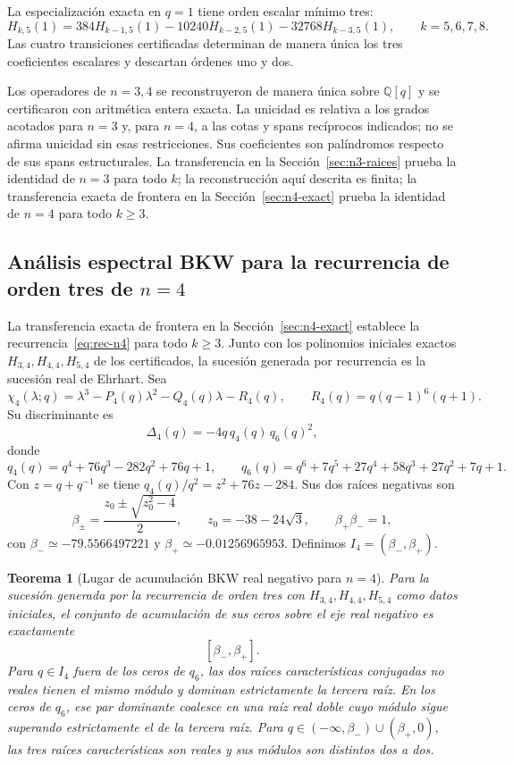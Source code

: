 \documentclass[11pt,a4paper]{article}
\newtheorem{theorem}{Teorema}[section]
\theoremstyle{definition}
\begin{document}
La especialización exacta en $q=1$ tiene orden escalar mínimo tres:
\begin{equation}\label{eq:escalar-n5}
H_{k,5}(1)=384H_{k-1,5}(1)
-10240H_{k-2,5}(1)-32768H_{k-3,5}(1),
\qquad k=5,6,7,8.
\end{equation}
Las cuatro transiciones certificadas determinan de manera única los tres
coeficientes escalares y descartan órdenes uno y dos.

Los operadores de $n=3,4$ se reconstruyeron de manera única sobre
$\mathbb Q[q]$ y se certificaron con aritmética entera exacta. La
unicidad es relativa a los grados acotados para $n=3$ y, para $n=4$, a
las cotas y spans recíprocos indicados; no se afirma unicidad sin esas
restricciones. Sus coeficientes son palíndromos respecto de sus spans
estructurales. La transferencia en la Sección~\ref{sec:n3-raices}
prueba la identidad de $n=3$ para todo $k$; la reconstrucción aquí
descrita es finita; la transferencia exacta de frontera en la
Sección~\ref{sec:n4-exact} prueba la identidad de $n=4$ para todo
$k\ge3$.

\subsection[Análisis espectral BKW para n=4]{Análisis espectral BKW para la recurrencia de orden tres de $n=4$}
\label{sec:n4-bkw}

La transferencia exacta de frontera en la Sección~\ref{sec:n4-exact}
establece la recurrencia~\eqref{eq:rec-n4} para todo $k\ge3$. Junto con
los polinomios iniciales exactos $H_{3,4},H_{4,4},H_{5,4}$ de los
certificados, la sucesión generada por recurrencia es la sucesión real
de Ehrhart. Sea
\[
\chi_4(\lambda;q)=\lambda^3-P_4(q)\lambda^2-Q_4(q)\lambda-R_4(q),
\qquad R_4(q)=q(q-1)^6(q+1).
\]
Su discriminante es
\[
\Delta_4(q)=-4q\,q_4(q)\,q_6(q)^2,
\]
donde
\[
q_4(q)=q^4+76q^3-282q^2+76q+1,\qquad
q_6(q)=q^6+7q^5+27q^4+58q^3+27q^2+7q+1.
\]
Con $z=q+q^{-1}$ se tiene $q_4(q)/q^2=z^2+76z-284$. Sus dos raíces
negativas son
\[
\beta_\pm=\frac{z_0\pm\sqrt{z_0^2-4}}2,\qquad
z_0=-38-24\sqrt3,\qquad \beta_+\beta_-=1,
\]
con $\beta_-\simeq-79.5566497221$ y
$\beta_+\simeq-0.01256965953$. Definimos
$I_4=(\beta_-,\beta_+)$.

\begin{theorem}[Lugar de acumulación BKW real negativo para $n=4$]
\label{thm:n4-bkw}
Para la sucesión generada por la recurrencia de orden tres con
$H_{3,4},H_{4,4},H_{5,4}$ como datos iniciales, el conjunto de
acumulación de sus ceros sobre el eje real negativo es exactamente
\[
[\beta_-,\beta_+].
\]
Para $q\in I_4$ fuera de los ceros de $q_6$, las dos raíces
características conjugadas no reales tienen el mismo módulo y dominan
estrictamente la tercera raíz. En los ceros de $q_6$, ese par dominante
coalesce en una raíz real doble cuyo módulo sigue superando
estrictamente el de la tercera raíz. Para
$q\in(-\infty,\beta_-)\cup(\beta_+,0)$, las tres raíces características
son reales y sus módulos son distintos dos a dos.
\end{theorem}
\end{document}
